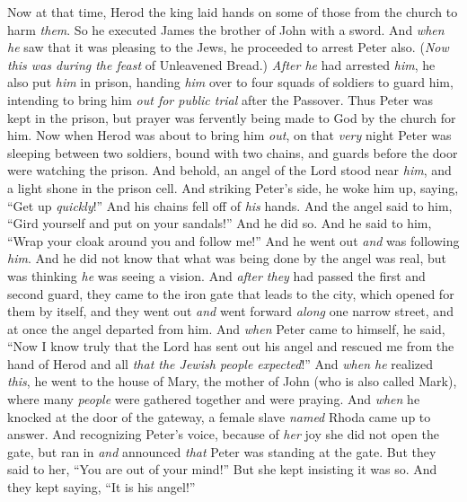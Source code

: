\begin{biblechapter} %
 Now at that time, Herod the king laid hands on some of those from the church to harm \textit{them}.
\verse So he executed James the brother of John with a sword.
\verse And \textit{when he} saw that it was pleasing to the Jews, he proceeded to arrest Peter also. (\textit{Now this was during the feast} of Unleavened Bread.)
\verse \textit{After he} had arrested \textit{him}, he also put \textit{him} in prison, handing \textit{him} over to four squads of soldiers to guard him, intending to bring him \textit{out for public trial} after the Passover.
\verse Thus Peter was kept in the prison, but prayer was fervently being made to God by the church for him.
 Now when Herod was about to bring him \textit{out}, on that \textit{very} night Peter was sleeping between two soldiers, bound with two chains, and guards before the door were watching the prison.
\verse And behold, an angel of the Lord stood near \textit{him}, and a light shone in the prison cell. And striking Peter’s side, he woke him up, saying, “Get up \textit{quickly}!” And his chains fell off of \textit{his} hands.
\verse And the angel said to him, “Gird yourself and put on your sandals!” And he did so. And he said to him, “Wrap your cloak around you and follow me!”
\verse And he went out \textit{and} was following \textit{him}. And he did not know that what was being done by the angel was real, but was thinking \textit{he} was seeing a vision.
\verse And \textit{after they} had passed the first and second guard, they came to the iron gate that leads to the city, which opened for them by itself, and they went out \textit{and} went forward \textit{along} one narrow street, and at once the angel departed from him.
\verse And \textit{when} Peter came to himself, he said, “Now I know truly that the Lord has sent out his angel and rescued me from the hand of Herod and all \textit{that the Jewish people expected}!”
\verse And \textit{when he} realized \textit{this}, he went to the house of Mary, the mother of John (who is also called Mark), where many \textit{people} were gathered together and were praying.
\verse And \textit{when} he knocked at the door of the gateway, a female slave \textit{named} Rhoda came up to answer.
\verse And recognizing Peter’s voice, because of \textit{her} joy she did not open the gate, but ran in \textit{and} announced \textit{that} Peter was standing at the gate.
\verse But they said to her, “You are out of your mind!” But she kept insisting it was so. And they kept saying, “It is his angel!”

\end{biblechapter}
